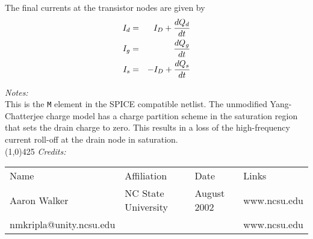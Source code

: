 \documentclass{article}
\newcommand{\fig}[1]{/#1}
\newcommand{\pfig}[1]{\epsfbox{\fig{#1}}}
\begin{document}
\noindent The final currents at the transistor nodes are given by
\begin{eqnarray}
I_d & = & I_{D} + {dQ_d \over dt} \\
I_g & = & {dQ_g \over dt} \\
I_s & = & -I_{D} + {dQ_s \over dt}
\end{eqnarray}



\noindent\textit{Notes:}\\
This is the \texttt{M} element in the SPICE compatible netlist.
The unmodified Yang-Chatterjee charge model has a charge partition
scheme in the saturation region that sets the drain charge to
zero.  This results in
a loss of the high-frequency current roll-off at the drain node in saturation. \\
\linethickness{0.5mm} \line(1,0){425}
\newline
\textit{Credits:}\\
\begin{tabular}{l l l l}
Name & Affiliation & Date & Links \\
Aaron Walker & NC State University & August 2002 & www.ncsu.edu \\
nmkripla@unity.ncsu.edu & & & www.ncsu.edu
\end{tabular}
\end{document}
